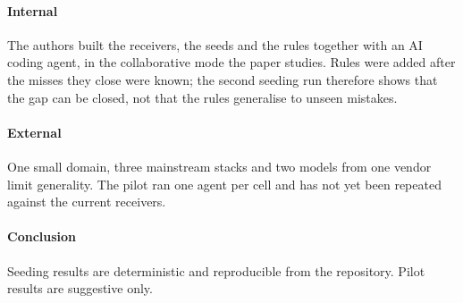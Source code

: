 \paragraph{Internal} The authors built the receivers, the seeds and the rules together with an
AI coding agent, in the collaborative mode the paper studies. Rules were added after the misses
they close were known; the second seeding run therefore shows that the gap can be closed, not
that the rules generalise to unseen mistakes.

\paragraph{External} One small domain, three mainstream stacks and two models from one vendor
limit generality. The pilot ran one agent per cell and has not yet been repeated against the
current receivers.

\paragraph{Conclusion} Seeding results are deterministic and reproducible from the repository.
Pilot results are suggestive only.
